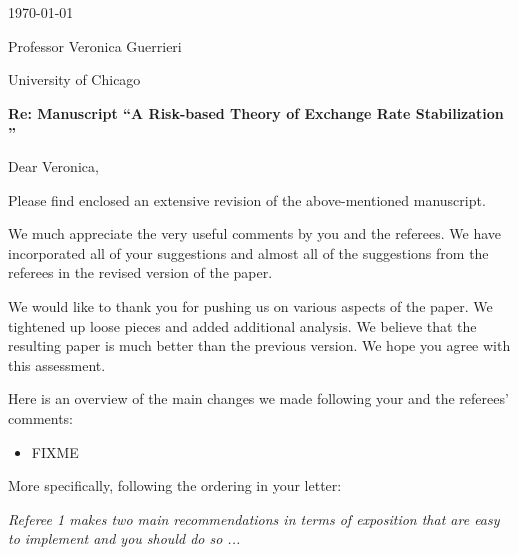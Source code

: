 \setcounter{table}{0} %
\setcounter{figure}{0} %
\setcounter{page}{1}

\setcounter{page}{1}

\noindent \bigskip

\bigskip

\bigskip

\noindent \today

\bigskip

\bigskip

\bigskip

\noindent Professor Veronica Guerrieri

\noindent 

\noindent University of Chicago\bigskip

\bigskip

\bigskip

\bigskip

\bigskip

\bigskip

\noindent \textbf{Re: Manuscript \textquotedblleft A Risk-based Theory
  of Exchange Rate Stabilization \textquotedblright }

\bigskip

\noindent Dear Veronica,

\bigskip


\noindent
Please find enclosed an extensive revision of the above-mentioned manuscript. 

We much appreciate the very useful comments by you and the referees.
We have incorporated all of your suggestions and almost all of the
suggestions from the referees in the revised version of the paper.

We would like to thank you for pushing us on various aspects of the
paper. We tightened up loose pieces and added additional analysis. We
believe that the resulting paper is much better than the previous
version. We hope you agree with this assessment.

Here is an overview of the main changes we made following your and the
referees' comments:

\begin{itemize}
\item FIXME
\end{itemize}

\bigskip

More specifically, following the ordering in your letter:

\textit{Referee 1 makes two main recommendations in terms of exposition that are easy
to implement and you should do so ...}

